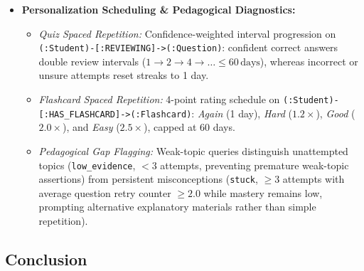 {\begin{itemize}
\begin{itemize}
\begin{itemize}[itemsep=1pt,topsep=1pt]
        \end{itemize}
        \item \textbf{Personalization Scheduling \& Pedagogical Diagnostics:}
        \begin{itemize}[itemsep=1pt,topsep=1pt]
            \item \textit{Quiz Spaced Repetition:} Confidence-weighted interval progression on \texttt{(:Student)-[:REVIEWING]->(:Question)}: confident correct answers double review intervals ($1 \to 2 \to 4 \to \dots \le 60\,\text{days}$), whereas incorrect or unsure attempts reset streaks to 1 day.
            \item \textit{Flashcard Spaced Repetition:} 4-point rating schedule on \texttt{(:Student)-[:HAS\_FLASHCARD]->(:Flashcard)}: \textit{Again} (1 day), \textit{Hard} ($1.2\times$), \textit{Good} ($2.0\times$), and \textit{Easy} ($2.5\times$), capped at 60 days.
            \item \textit{Pedagogical Gap Flagging:} Weak-topic queries distinguish unattempted topics (\texttt{low\_evidence}, $<3$ attempts, preventing premature weak-topic assertions) from persistent misconceptions (\texttt{stuck}, $\ge 3$ attempts with average question retry counter $\ge 2.0$ while mastery remains low, prompting alternative explanatory materials rather than simple repetition).
        \end{itemize}
    \end{itemize}
\end{itemize}\par}


\subsection*{Conclusion}

